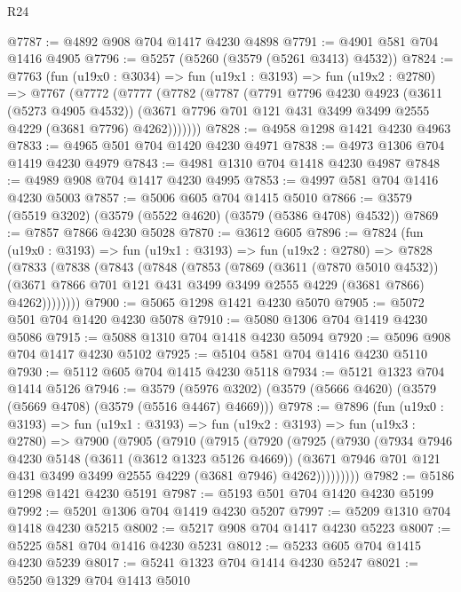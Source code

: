 \begin{lexlean}{R24}
\begin{coremodule}
@7787 := @4892 @908 @704 @1417 @4230 @4898
@7791 := @4901 @581 @704 @1416 @4905
@7796 := @5257 (@5260 (@3579 (@5261 @3413) @4532))
@7824 := @7763
    (fun (u19x0 : @3034) =>
    fun (u19x1 : @3193) =>
    fun (u19x2 : @2780) =>
    @7767
      (@7772
        (@7777
          (@7782
            (@7787
              (@7791
                @7796
                @4230
                @4923
                (@3611 (@5273 @4905 @4532))
                (@3671 @7796 @701 @121 @431 @3499 @3499 @2555 @4229 (@3681 @7796) @4262)))))))
@7828 := @4958 @1298 @1421 @4230 @4963
@7833 := @4965 @501 @704 @1420 @4230 @4971
@7838 := @4973 @1306 @704 @1419 @4230 @4979
@7843 := @4981 @1310 @704 @1418 @4230 @4987
@7848 := @4989 @908 @704 @1417 @4230 @4995
@7853 := @4997 @581 @704 @1416 @4230 @5003
@7857 := @5006 @605 @704 @1415 @5010
@7866 := @3579 (@5519 @3202) (@3579 (@5522 @4620) (@3579 (@5386 @4708) @4532))
@7869 := @7857 @7866 @4230 @5028
@7870 := @3612 @605
@7896 := @7824
    (fun (u19x0 : @3193) =>
    fun (u19x1 : @3193) =>
    fun (u19x2 : @2780) =>
    @7828
      (@7833
        (@7838
          (@7843
            (@7848
              (@7853
                (@7869
                  (@3611 (@7870 @5010 @4532))
                  (@3671 @7866 @701 @121 @431 @3499 @3499 @2555 @4229 (@3681 @7866) @4262))))))))
@7900 := @5065 @1298 @1421 @4230 @5070
@7905 := @5072 @501 @704 @1420 @4230 @5078
@7910 := @5080 @1306 @704 @1419 @4230 @5086
@7915 := @5088 @1310 @704 @1418 @4230 @5094
@7920 := @5096 @908 @704 @1417 @4230 @5102
@7925 := @5104 @581 @704 @1416 @4230 @5110
@7930 := @5112 @605 @704 @1415 @4230 @5118
@7934 := @5121 @1323 @704 @1414 @5126
@7946 := @3579 (@5976 @3202) (@3579 (@5666 @4620) (@3579 (@5669 @4708) (@3579 (@5516 @4467) @4669)))
@7978 := @7896
    (fun (u19x0 : @3193) =>
    fun (u19x1 : @3193) =>
    fun (u19x2 : @3193) =>
    fun (u19x3 : @2780) =>
    @7900
      (@7905
        (@7910
          (@7915
            (@7920
              (@7925
                (@7930
                  (@7934
                    @7946
                    @4230
                    @5148
                    (@3611 (@3612 @1323 @5126 @4669))
                    (@3671 @7946 @701 @121 @431 @3499 @3499 @2555 @4229 (@3681 @7946) @4262)))))))))
@7982 := @5186 @1298 @1421 @4230 @5191
@7987 := @5193 @501 @704 @1420 @4230 @5199
@7992 := @5201 @1306 @704 @1419 @4230 @5207
@7997 := @5209 @1310 @704 @1418 @4230 @5215
@8002 := @5217 @908 @704 @1417 @4230 @5223
@8007 := @5225 @581 @704 @1416 @4230 @5231
@8012 := @5233 @605 @704 @1415 @4230 @5239
@8017 := @5241 @1323 @704 @1414 @4230 @5247
@8021 := @5250 @1329 @704 @1413 @5010

\end{coremodule}
\end{lexlean}
